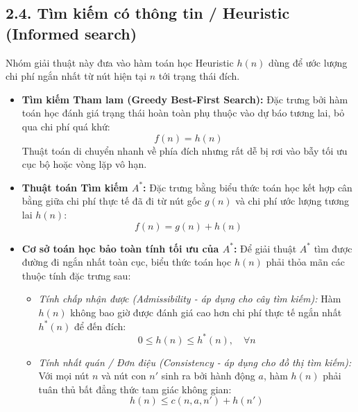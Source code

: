 \documentclass[../main.tex]{subfiles}
\begin{document}
\subsection{2.4. Tìm kiếm có thông tin / Heuristic (Informed search)}
Nhóm giải thuật này đưa vào hàm toán học Heuristic $h(n)$ dùng để ước lượng chi phí ngắn nhất từ nút hiện tại $n$ tới trạng thái đích.
\begin{itemize}
    \item \textbf{Tìm kiếm Tham lam (Greedy Best-First Search):} Đặc trưng bởi hàm toán học đánh giá trạng thái hoàn toàn phụ thuộc vào dự báo tương lai, bỏ qua chi phí quá khứ:
    \begin{equation}
        f(n) = h(n)
    \end{equation}
    Thuật toán di chuyển nhanh về phía đích nhưng rất dễ bị rơi vào bẫy tối ưu cục bộ hoặc vòng lặp vô hạn.
    \item \textbf{Thuật toán Tìm kiếm $A^*$:} Đặc trưng bằng biểu thức toán học kết hợp cân bằng giữa chi phí thực tế đã đi từ nút gốc $g(n)$ và chi phí ước lượng tương lai $h(n)$:
    \begin{equation}
        f(n) = g(n) + h(n)
    \end{equation}
    \item \textbf{Cơ sở toán học bảo toàn tính tối ưu của $A^*$:} Để giải thuật $A^*$ tìm được đường đi ngắn nhất toàn cục, biểu thức toán học $h(n)$ phải thỏa mãn các thuộc tính đặc trưng sau:
    \begin{itemize}
        \item \textit{Tính chấp nhận được (Admissibility - áp dụng cho cây tìm kiếm):} Hàm $h(n)$ không bao giờ được đánh giá cao hơn chi phí thực tế ngắn nhất $h^*(n)$ để đến đích:
        \begin{equation}
            0 \le h(n) \le h^*(n), \quad \forall n
        \end{equation}
        \item \textit{Tính nhất quán / Đơn điệu (Consistency - áp dụng cho đồ thị tìm kiếm):} Với mọi nút $n$ và nút con $n'$ sinh ra bởi hành động $a$, hàm $h(n)$ phải tuân thủ bất đẳng thức tam giác không gian:
        \begin{equation}
            h(n) \le c(n, a, n') + h(n')
        \end{equation}
    \end{itemize}
\end{itemize}
\end{document}

